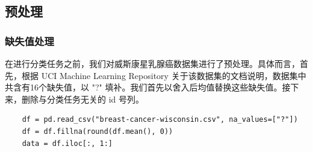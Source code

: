 \documentclass[a4paper,12pt,onecolumn,oneside]{article}
\begin{document}
\subsection{预处理}
\subsubsection{缺失值处理}
在进行分类任务之前，我们对威斯康星乳腺癌数据集进行了预处理。具体而言，首先，根据 UCI Machine Learning Repository 关于该数据集的文档说明，数据集中共含有16个缺失值，以 "?" 填补。我们首先以舍入后均值替换这些缺失值。接下来，删除与分类任务无关的 id 号列。
\lstset{language=Python}
\lstset{frame=lines}
\lstset{basicstyle=\footnotesize}
\begin{lstlisting}
	df = pd.read_csv("breast-cancer-wisconsin.csv", na_values=["?"])
	df = df.fillna(round(df.mean(), 0))
	data = df.iloc[:, 1:]
\end{lstlisting}
\end{document}
